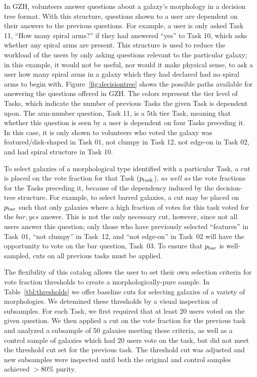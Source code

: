 \documentclass[twocolumn]{aastex6}
\begin{document}
In GZH, volunteers answer questions about a galaxy's morphology in a decision tree format. With this structure, questions shown to a user are dependent on their answers to the previous questions. For example, a user is only asked Task 11, ``How many spiral arms?'' if they had answered ``yes'' to Task 10, which asks whether any spiral arms are present. This structure is used to reduce the workload of the users by only asking questions relevant to the particular galaxy; in this example, it would not be useful, nor would it make physical sense, to ask a user how many spiral arms in a galaxy which they had declared had no spiral arms to begin with. Figure~\ref{fig:decisiontree} shows the possible paths available for answering the questions offered in GZH. The colors represent the tier level of Tasks, which indicate the number of previous Tasks the given Task is dependent upon. The arm-number question, Task 11, is a 5th tier Task, meaning that whether this question is seen by a user is dependent on four Tasks preceding it. In this case, it is only shown to volunteers who voted the galaxy was featured/disk-shaped in Task 01, not clumpy in Task 12, not edge-on in Task 02, and had spiral structure in Task 10.  

To select galaxies of a morphological type identified with a particular Task, a cut is placed on the vote fraction for that Task ($p_{\rm task}$), \emph{as well as} the vote fractions for the Tasks preceding it, because of the dependency induced by the decision-tree structure. For example, to select barred galaxies, a cut may be placed on $p_{\rm bar}$ such that only galaxies where a high fraction of votes for this task voted for the $bar,yes$ answer. This is not the only necessary cut, however, since not all users answer this question; only those who have previously selected ``features'' in Task~01, ``not clumpy'' in Task~12, and ``not edge-on'' in Task~02 will have the opportunity to vote on the bar question, Task~03. To ensure that $p_{\rm bar}$ is well-sampled, cuts on all previous tasks must be applied. 

The flexibility of this catalog allows the user to set their own selection criteria for vote fraction thresholds to create a morphologically-pure sample. In Table~\ref{tbl:thresholds} we offer baseline cuts for selecting galaxies of a variety of morphologies. We detemined these thresholds by a visual inspection of subsamples. For each Task, we first required that at least 20 users voted on the given question. We then applied a cut on the vote fraction for the previous task and analyzed a subsample of 50 galaxies meeting these criteria, as well as a control sample of galaxies which had 20 users vote on the task, but did not meet the threshold cut set for the previous task. The threshold cut was adjusted and new subsamples were inspected until both the original and control samples achieved $>80\%$ purity.
\end{document}
